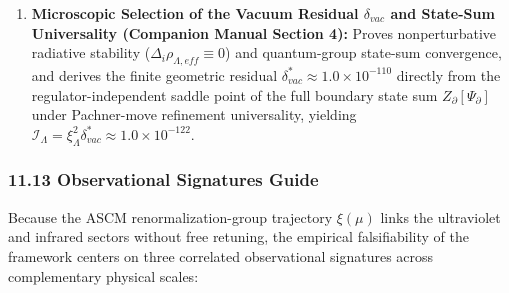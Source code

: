 \documentclass[aps,prd,onecolumn,superscriptaddress,nofootinbib,longbibliography,10pt]{revtex4-2}
\begin{document}
\begin{enumerate}
\item \textbf{Microscopic Selection of the Vacuum Residual \(\delta_{vac}\) and State-Sum Universality (Companion Manual Section 4):} Proves nonperturbative radiative stability (\(\Delta_i \rho_{\Lambda,eff} \equiv 0\)) and quantum-group state-sum convergence, and derives the finite geometric residual \(\delta_{vac}^* \approx 1.0 \times 10^{-110}\) directly from the regulator-independent saddle point of the full boundary state sum \(Z_\partial[\Psi_\partial]\) under Pachner-move refinement universality, yielding \(\mathcal{I}_\Lambda = \xi_\Lambda^2 \delta_{vac}^* \approx 1.0 \times 10^{-122}\).
  
\end{enumerate}

  
  
\subsubsection*{11.13 Observational Signatures Guide}

  Because the ASCM renormalization-group trajectory \(\xi(\mu)\) links the ultraviolet and infrared sectors without free retuning, the empirical falsifiability of the framework centers on three correlated observational signatures across complementary physical scales:
\end{document}
